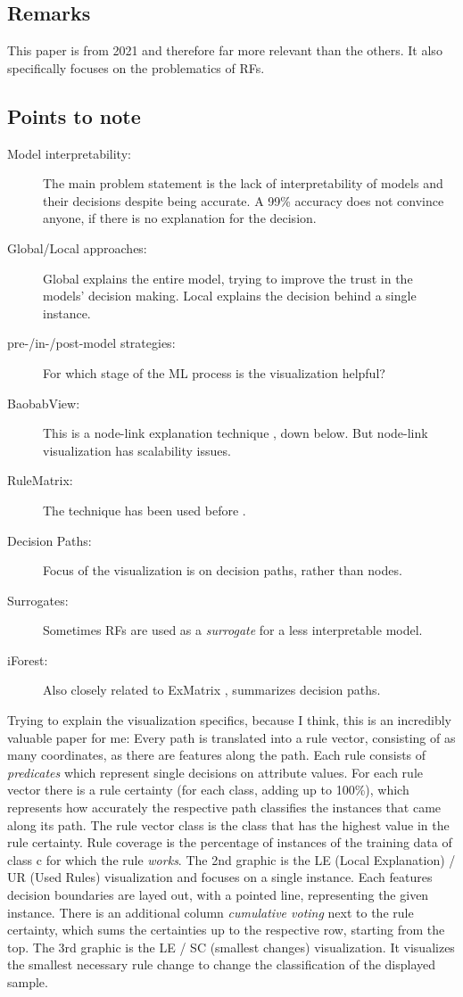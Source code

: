 \documentclass[a4paper, 12pt]{article}
\begin{document}
\subsection{Remarks}
This paper is from 2021 and therefore far more relevant than the others. It also specifically focuses on the
problematics of RFs.

\subsection{Points to note}
\begin{description}
    \item[Model interpretability:]The main problem statement is the lack of interpretability of models and their
            decisions despite being accurate. A 99\% accuracy does not convince anyone, if there is no
            explanation for the decision.
    \item [Global/Local approaches:]Global explains the entire model, trying to improve the trust in the models'
            decision making. Local explains the decision behind a single instance.
    \item[pre-/in-/post-model strategies:]For which stage of the ML process is the visualization helpful?
    \item[BaobabView:]This is a node-link explanation technique \cite{van2011baobabview}, down below. But node-link
            visualization has scalability issues.
    \item [RuleMatrix:]The technique has been used before \cite{ming2018rulematrix}.
    \item [Decision Paths:]Focus of the visualization is on decision paths, rather than nodes.
    \item [Surrogates:]Sometimes RFs are used as a \textit{surrogate} for a less interpretable model.
    \item [iForest:]Also closely related to ExMatrix \cite{zhao2018iforest}, summarizes decision paths.
\end{description}
Trying to explain the visualization specifics, because I think, this is an incredibly valuable paper for me:
Every path is translated into a rule vector, consisting of as many coordinates, as there are features along the 
path. Each rule consists of \textit{predicates} which represent single decisions on attribute values. 
For each rule vector there is a rule certainty (for each class, adding up to 100\%), which represents how
accurately the respective path classifies the instances that came along its path. The rule vector class is the
class that has the highest value in the rule certainty. Rule coverage is the percentage of instances of the
training data of class c for which the rule \textit{works}.
The 2nd graphic is the LE (Local Explanation) / UR (Used Rules) visualization and focuses on a single instance.
Each features decision boundaries are layed out, with a pointed line, representing the given instance.
There is an additional column \textit{cumulative voting} next to the rule certainty, which sums the certainties
up to the respective row, starting from the top.
The 3rd graphic is the LE / SC (smallest changes) visualization. It visualizes the smallest necessary rule change
to change the classification of the displayed sample.
\end{document}
